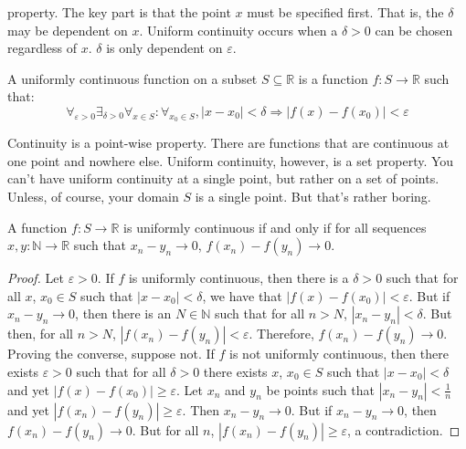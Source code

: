     property. The key part is that the point $x$ must be specified first. That
    is, the $\delta$ may be dependent on $x$. Uniform continuity occurs when a
    $\delta>0$ can be chosen regardless of $x$. $\delta$ is only dependent on
    $\varepsilon$.
    \begin{definition}
        A uniformly continuous function on a subset $S\subseteq\mathbb{R}$
        is a function $f:S\rightarrow\mathbb{R}$ such that:
        \begin{equation*}
            \forall_{\varepsilon>0}\exists_{\delta>0}
            \forall_{x\in{S}}:\forall_{x_{0}\in{S}},|x-x_{0}|<\delta
            \Rightarrow|f(x)-f(x_{0})|<\varepsilon    
        \end{equation*}
    \end{definition}
    Continuity is a point-wise property. There are functions that are
    continuous at one point and nowhere else. Uniform continuity, however, is a
    set property. You can't have uniform continuity at a single point, but
    rather on a set of points. Unless, of course, your domain $S$ is a single
    point. But that's rather boring.
    \begin{theorem}
        \label{thm:Equiv_Def_of_Uni_Cont}%
        A function $f:S\rightarrow\mathbb{R}$ is uniformly continuous if and
        only if for all sequences $x,y:\mathbb{N}\rightarrow\mathbb{R}$ such
        that $x_{n}-y_{n}\rightarrow{0}$, $f(x_{n})-f(y_{n})\rightarrow{0}$.
    \end{theorem}
    \begin{proof}
        Let $\varepsilon>0$. If $f$ is uniformly continuous, then there is a
        $\delta>0$ such that for all $x$, $x_{0}\in{S}$ such that
        $|x-x_{0}|<\delta$, we have that $|f(x)-f(x_{0})|<\varepsilon$. But
        if $x_{n}-y_{n}\rightarrow{0}$, then there is an $N\in\mathbb{N}$ such
        that for all $n>N$, $|x_{n}-y_{n}|<\delta$. But then, for all $n>N$,
        $|f(x_{n})-f(y_{n})|<\varepsilon$. Therefore,
        $f(x_{n})-f(y_{n})\rightarrow{0}$. Proving the converse, suppose not.
        If $f$ is not uniformly continuous, then there exists $\varepsilon>0$
        such that for all $\delta>0$ there exists $x$, $x_{0}\in{S}$ such that
        $|x-x_{0}|<\delta$ and yet $|f(x)-f(x_{0})|\geq{\varepsilon}$. Let
        $x_{n}$ and $y_{n}$ be points such that $|x_{n}-y_{n}|<\frac{1}{n}$ and
        yet $|f(x_{n})-f(y_{n})|\geq\varepsilon$. Then
        $x_{n}-y_{n}\rightarrow{0}$. But if $x_{n}-y_{n}\rightarrow{0}$, then
        $f(x_{n})-f(y_{n})\rightarrow{0}$. But for all $n$,
        $|f(x_{n})-f(y_{n})|\geq{\varepsilon}$, a contradiction.
    \end{proof}

